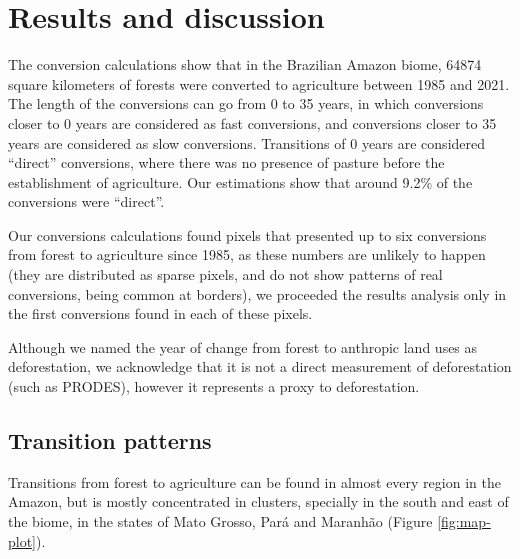 \documentclass[essd, manuscript]{copernicus}
\begin{document}
\section{Results and discussion}

The conversion calculations show that in the Brazilian Amazon biome, 64874 square kilometers of forests were converted to agriculture between 1985 and 2021.
The length of the conversions can go from 0 to 35 years, in which conversions closer to 0 years are considered as fast conversions, and conversions closer to 35 years are considered as slow conversions.
Transitions of 0 years are considered ``direct'' conversions, where there was no presence of pasture before the establishment of agriculture.
Our estimations show that around 9.2\% of the conversions were ``direct''.

Our conversions calculations found pixels that presented up to six conversions from forest to agriculture since 1985, as these numbers are unlikely to happen (they are distributed as sparse pixels, and do not show patterns of real conversions, being common at borders), we proceeded the results analysis only in the first conversions found in each of these pixels.

Although we named the year of change from forest to anthropic land uses as deforestation, we acknowledge that it is not a direct measurement of deforestation (such as PRODES), however it represents a proxy to deforestation.

\subsection{Transition patterns}

Transitions from forest to agriculture can be found in almost every region in the Amazon, but is mostly concentrated in clusters, specially in the south and east of the biome, in the states of Mato Grosso, Pará and Maranhão (Figure \ref{fig:map-plot}).
\end{document}
